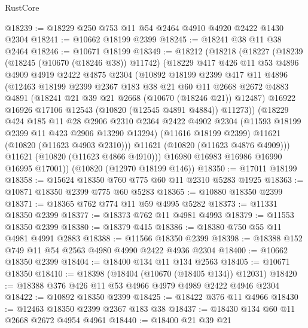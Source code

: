 \begin{lexlean}{RustCore}
\begin{coremodule}
@18239 := @18229 @250 @753 @11 @54 @2464 @4910 @4920 @2422 @1430 @2304
@18241 := @10662 @18199 @2399
@18245 := @18241 @38 @11 @38 @2464
@18246 := @10671 @18199
@18349 := @18212
    (@18218
      (@18227
        (@18239
          (@18245 (@10670 (@18246 @38)) @11742)
          (@18229
            @417
            @426
            @11
            @53
            @4896
            @4909
            @4919
            @2422
            @4875
            @2304
            (@10892
              @18199
              @2399
              @417
              @11
              @4896
              (@12463
                @18199
                @2399
                @2367
                @183
                @38
                @21
                @60
                @11
                @2668
                @2672
                @4883
                @4891
                (@18241 @21 @39 @21 @2668 (@10670 (@18246 @21)) @12487)
                @16922
                @16926
                @17106
                @12543
                (@10820 (@12545 @4891 @4884))
                @11273))
            (@18229
              @424
              @185
              @11
              @28
              @2906
              @2310
              @2364
              @2422
              @4902
              @2304
              (@11593 @18199 @2399 @11 @423 @2906 @13290 @13294)
              (@11616 @18199 @2399)
              @11621
              (@10820 (@11623 @4903 @2310)))
            @11621
            (@10820 (@11623 @4876 @4909)))
          @11621
          (@10820 (@11623 @4866 @4910)))
        @16980
        @16983
        @16986
        @16990
        @16995
        @17001))
    (@10820 (@12970 @18199 @146))
@18350 := @17011 @18199
@18358 := @15624 @18350 @760 @775 @60 @11 @2310 @5283 @1925
@18363 := @10871 @18350 @2399 @775 @60 @5283
@18365 := @10880 @18350 @2399
@18371 := @18365 @762 @774 @11 @59 @4995 @5282
@18373 := @11331 @18350 @2399
@18377 := @18373 @762 @11 @4981 @4993
@18379 := @11553 @18350 @2399
@18380 := @18379 @415
@18386 := @18380 @750 @55 @11 @4981 @4991 @2883
@18388 := @11566 @18350 @2399
@18398 := @18388 @152 @749 @11 @54 @2563 @4980 @4990 @2422 @4936 @2304
@18400 := @10662 @18350 @2399
@18404 := @18400 @134 @11 @134 @2563
@18405 := @10671 @18350
@18410 := @18398 (@18404 (@10670 (@18405 @134)) @12031)
@18420 := @18388 @376 @426 @11 @53 @4966 @4979 @4989 @2422 @4946 @2304
@18422 := @10892 @18350 @2399
@18425 := @18422 @376 @11 @4966
@18430 := @12463 @18350 @2399 @2367 @183 @38
@18437 := @18430 @134 @60 @11 @2668 @2672 @4954 @4961
@18440 := @18400 @21 @39 @21

\end{coremodule}
\end{lexlean}
